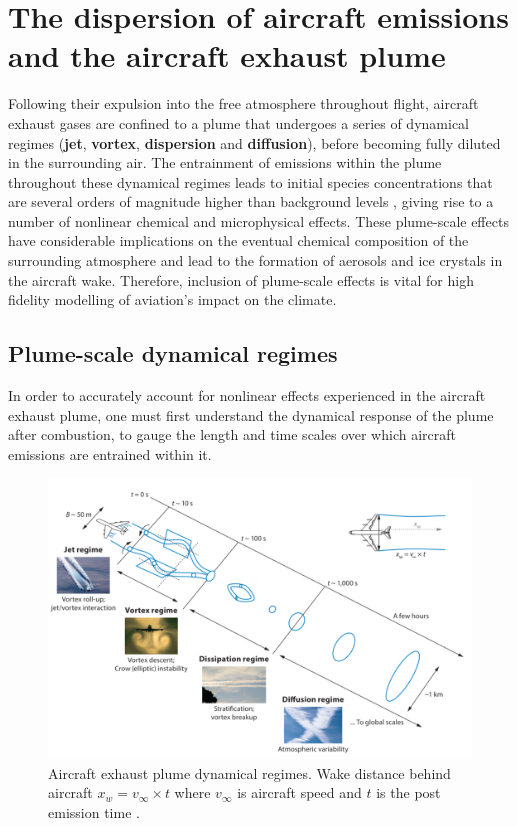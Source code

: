 \section{The dispersion of aircraft emissions and the aircraft exhaust plume}
Following their expulsion into the free atmosphere throughout flight, aircraft exhaust gases are confined to a plume that undergoes a series of dynamical regimes (\textbf{jet}, \textbf{vortex}, \textbf{dispersion} and \textbf{diffusion}), before becoming fully diluted in the surrounding air. The entrainment of emissions within the plume throughout these dynamical regimes leads to initial species concentrations that are several orders of magnitude higher than background levels \cite{Danilin1994}, giving rise to a number of nonlinear chemical and microphysical effects. These plume-scale effects have considerable implications on the eventual chemical composition of the surrounding atmosphere and lead to the formation of aerosols and ice crystals in the aircraft wake. Therefore, inclusion of plume-scale effects is vital for high fidelity modelling of aviation's impact on the climate. %

\subsection{Plume-scale dynamical regimes}
 In order to accurately account for nonlinear effects experienced in the aircraft exhaust plume, one must first understand the dynamical response of the plume after combustion, to gauge the length and time scales over which aircraft emissions are entrained within it.

\begin{figure}[H]
  \centering
  \includegraphics[width=0.8\linewidth]{Dynamics.png}
  \caption{Aircraft exhaust plume dynamical regimes. Wake distance behind aircraft $x_w = v_\infty \times t$ where $v_\infty$ is aircraft speed and $t$ is the post emission time \cite{Paoli2016, Gerz1998}.}
  \label{Plume}
\end{figure}

